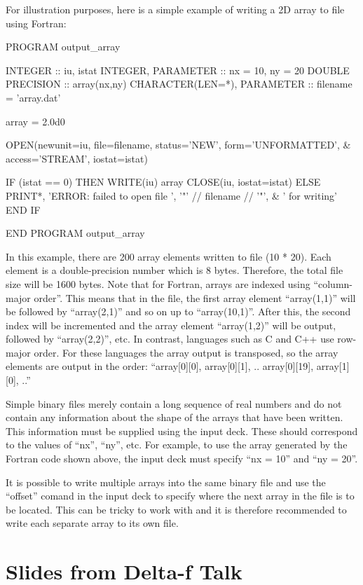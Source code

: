 For illustration purposes, here is a simple example of writing a 2D array
to file using Fortran:
\begin{boxverbatim}
PROGRAM output_array

  INTEGER :: iu, istat
  INTEGER, PARAMETER :: nx = 10, ny = 20
  DOUBLE PRECISION :: array(nx,ny)
  CHARACTER(LEN=*), PARAMETER :: filename = 'array.dat'

  array = 2.0d0

  OPEN(newunit=iu, file=filename, status='NEW', form='UNFORMATTED', &
       access='STREAM', iostat=istat)

  IF (istat == 0) THEN
    WRITE(iu) array
    CLOSE(iu, iostat=istat)
  ELSE
    PRINT*, 'ERROR: failed to open file ', '"' // filename // '"', &
            ' for writing'
  END IF

END PROGRAM output_array
\end{boxverbatim}

In this example, there are 200 array elements written to file (10 * 20). Each
element is a double-precision number which is 8 bytes. Therefore, the total
file size will be 1600 bytes. Note that for Fortran, arrays are indexed using
``column-major order''. This means that in the file, the first array element
``array(1,1)'' will be followed by ``array(2,1)'' and so on up
to ``array(10,1)''. After this, the second index will be incremented and the
array element ``array(1,2)'' will be output, followed by ``array(2,2)'', etc.
In contrast, languages such as C and C++ use row-major order. For these
languages the array output is transposed, so the array elements are output
in the order: ``array[0][0], array[0][1], .. array[0][19], array[1][0], ..''

Simple binary files merely contain a long sequence of real numbers and do not
contain any information about the shape of the arrays that have been written.
This information must be supplied using the input deck. These should correspond
to the values of ``nx'', ``ny'', etc. For example, to use the array generated
by the Fortran code shown above, the input deck must specify ``nx = 10'' and
``ny = 20''.

It is possible to write multiple arrays into the same binary file and use
the ``offset'' comand in the input deck to specify where the next array in
the file is to be located. This can be tricky to work with and it is therefore
recommended to write each separate array to its own file.


\section{Slides from Delta-f Talk}
\label{sec:deltaf_slides}


{}





